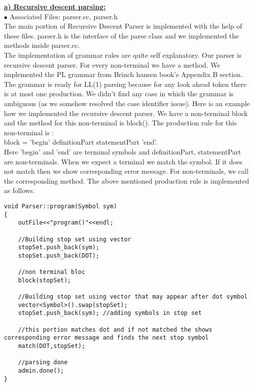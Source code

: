 \documentclass[paper=letter, fontsize=12pt]{scrartcl} %
\begin{document}
\underline {\bf a) Recursive descent parsing:}\\

$\bullet$ Associated Files: parser.cc, parser.h\\ 

The main portion of Recursive Descent Parser is implemented with the help of these files. parser.h is the interface of the parse class and we implemented the methods inside parser.cc.\\

The implementation of grammar rules are quite self explanatory. Our parser is recursive descent parser. For every non-terminal we have a method. We implemented the PL grammar from Brinch hansen book's Appendix B section. The grammar is ready for LL(1) parsing because for any look ahead token there is at most one production. We didn't find any case in which the grammar is ambiguous (as we somehow resolved the case identifier issue). Here is an example how we implemented the recursive descent parser. We have a non-terminal block and the method for this non-terminal is block(). The production rule for this non-terminal is :\\

block = 'begin' definitionPart statementPart 'end'.\\

Here 'begin' and 'end' are terminal symbols and definitionPart, statementPart are non-terminals. When we expect a terminal we match the symbol. If it does not match then we show corresponding error message. For non-terminals, we call the corresponding method. The above mentioned production rule is implemented as follows.

\begin{lstlisting}
void Parser::program(Symbol sym)
{
	outFile<<"program()"<<endl;
	
	//Building stop set using vector		
	stopSet.push_back(sym);
	stopSet.push_back(DOT);
		
	//non terminal bloc	
	block(stopSet);	
	
	//Building stop set using vector that may appear after dot symbol
	vector<Symbol>().swap(stopSet);
	stopSet.push_back(sym); //adding symbols in stop set
	
	//this portion matches dot and if not matched the shows corresponding error message and finds the next stop symbol
	match(DOT,stopSet);
	
	//parsing done
	admin.done();
}

\end{lstlisting}
\end{document}
